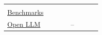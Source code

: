 \documentclass[smallextended]{svjour3}
\newcommand{\must}{\textbf{must}\xspace}
\newcommand{\should}{\textbf{should}\xspace}
\newcommand{\iconM}{\usebox{\iconMbox}\xspace}
\newcommand{\iconS}{\usebox{\iconSbox}\xspace}
\newcommand{\iconM}{●\xspace}
\newcommand{\iconS}{○\xspace}
\begin{document}
\begin{appendices}
\begin{center}
\begin{tabular}{@{} l c c c c c c c @{}}
  & \iconS %
  & \iconS %
  & \iconS %
  & \iconM %
  & \iconS %
  & \iconS %
  \\
\hyperref[sec:use-suitable-baselines-benchmarks-and-metrics]{Benchmarks}
  & \iconM %
  & \iconS %
  & \iconS %
  & \iconS %
  & \iconS %
  & \iconS %
  & \iconM %
  \\
\hyperref[sec:use-an-open-llm-as-a-baseline]{Open LLM}
  & \iconS %
  & \iconS %
  & \iconS %
  & --     %

\end{tabular}
\end{center}
\end{appendices}
\end{document}
